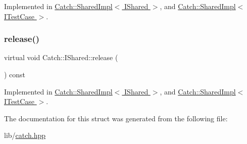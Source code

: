 Implemented in \hyperlink{struct_catch_1_1_shared_impl_a5d1a4c96e8fc07c821890fd09749062e}{Catch\+::\+Shared\+Impl$<$ I\+Shared $>$}, and \hyperlink{struct_catch_1_1_shared_impl_a5d1a4c96e8fc07c821890fd09749062e}{Catch\+::\+Shared\+Impl$<$ I\+Test\+Case $>$}.

\hypertarget{struct_catch_1_1_i_shared_a002f52624728a763956fb6f230cb2f57}{}\label{struct_catch_1_1_i_shared_a002f52624728a763956fb6f230cb2f57} 
\subsubsection{\texorpdfstring{release()}{release()}}
{\footnotesize\ttfamily virtual void Catch\+::\+I\+Shared\+::release (\begin{DoxyParamCaption}{ }\end{DoxyParamCaption}) const\hspace{0.3cm}{\ttfamily [pure virtual]}}



Implemented in \hyperlink{struct_catch_1_1_shared_impl_ada8052c6f24fd73ec099333626f106fe}{Catch\+::\+Shared\+Impl$<$ I\+Shared $>$}, and \hyperlink{struct_catch_1_1_shared_impl_ada8052c6f24fd73ec099333626f106fe}{Catch\+::\+Shared\+Impl$<$ I\+Test\+Case $>$}.



The documentation for this struct was generated from the following file\+:\begin{DoxyCompactItemize}
\item 
lib/\hyperlink{catch_8hpp}{catch.\+hpp}\end{DoxyCompactItemize}
